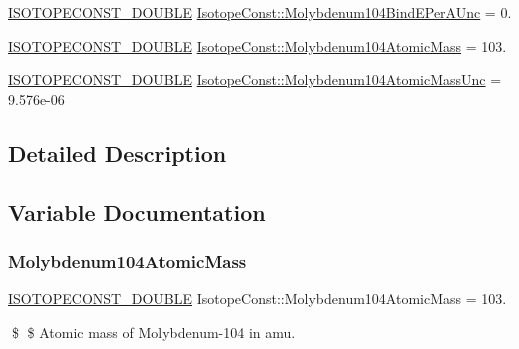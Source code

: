 \begin{DoxyCompactItemize}
\item 
\mbox{\hyperlink{group___isotope_const-_macros_ga8f45a7272ce02c0b4c65c44636ed719a}{I\+S\+O\+T\+O\+P\+E\+C\+O\+N\+S\+T\+\_\+\+D\+O\+U\+B\+LE}} \mbox{\hyperlink{group___isotope_const-_molybdenum-_mo104_gaa620345e8630ad8a351e77d901349d23}{Isotope\+Const\+::\+Molybdenum104\+Bind\+E\+Per\+A\+Unc}} = 0.
\item 
\mbox{\hyperlink{group___isotope_const-_macros_ga8f45a7272ce02c0b4c65c44636ed719a}{I\+S\+O\+T\+O\+P\+E\+C\+O\+N\+S\+T\+\_\+\+D\+O\+U\+B\+LE}} \mbox{\hyperlink{group___isotope_const-_molybdenum-_mo104_ga5b5fdcad3342ab52ec0596538a62989e}{Isotope\+Const\+::\+Molybdenum104\+Atomic\+Mass}} = 103.
\item 
\mbox{\hyperlink{group___isotope_const-_macros_ga8f45a7272ce02c0b4c65c44636ed719a}{I\+S\+O\+T\+O\+P\+E\+C\+O\+N\+S\+T\+\_\+\+D\+O\+U\+B\+LE}} \mbox{\hyperlink{group___isotope_const-_molybdenum-_mo104_ga106feb414589cea9cf3517b24cdefff1}{Isotope\+Const\+::\+Molybdenum104\+Atomic\+Mass\+Unc}} = 9.\+576e-\/06
\end{DoxyCompactItemize}


\subsection{Detailed Description}


\subsection{Variable Documentation}
\mbox{\label{group___isotope_const-_molybdenum-_mo104_ga5b5fdcad3342ab52ec0596538a62989e}} 
\subsubsection{\texorpdfstring{Molybdenum104\+Atomic\+Mass}{Molybdenum104AtomicMass}}
{\footnotesize\ttfamily \mbox{\hyperlink{group___isotope_const-_macros_ga8f45a7272ce02c0b4c65c44636ed719a}{I\+S\+O\+T\+O\+P\+E\+C\+O\+N\+S\+T\+\_\+\+D\+O\+U\+B\+LE}} Isotope\+Const\+::\+Molybdenum104\+Atomic\+Mass = 103.}

\$ \$ Atomic mass of Molybdenum-\/104 in amu. \mbox{\label{group___isotope_const-_molybdenum-_mo104_ga106feb414589cea9cf3517b24cdefff1}} 
